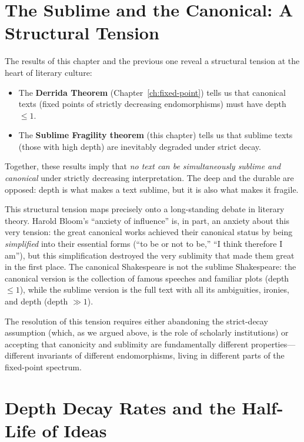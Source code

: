 \documentclass[11pt,openany]{book}
\theoremstyle{definition}
\theoremstyle{plain}
\theoremstyle{remark}
\begin{document}
\section{The Sublime and the Canonical: A Structural Tension}

The results of this chapter and the previous one reveal a structural tension at the heart of literary culture:

\begin{itemize}
\item The \textbf{Derrida Theorem} (Chapter~\ref{ch:fixed-point}) tells us that canonical texts (fixed points of strictly decreasing endomorphisms) must have depth $\leq 1$.
\item The \textbf{Sublime Fragility theorem} (this chapter) tells us that sublime texts (those with high depth) are inevitably degraded under strict decay.
\end{itemize}

Together, these results imply that \emph{no text can be simultaneously sublime and canonical} under strictly decreasing interpretation. The deep and the durable are opposed: depth is what makes a text sublime, but it is also what makes it fragile.

This structural tension maps precisely onto a long-standing debate in literary theory. Harold Bloom's ``anxiety of influence'' is, in part, an anxiety about this very tension: the great canonical works achieved their canonical status by being \emph{simplified} into their essential forms (``to be or not to be,'' ``I think therefore I am''), but this simplification destroyed the very sublimity that made them great in the first place. The canonical Shakespeare is not the sublime Shakespeare: the canonical version is the collection of famous speeches and familiar plots (depth $\leq 1$), while the sublime version is the full text with all its ambiguities, ironies, and depth (depth $\gg 1$).

The resolution of this tension requires either abandoning the strict-decay assumption (which, as we argued above, is the role of scholarly institutions) or accepting that canonicity and sublimity are fundamentally different properties---different invariants of different endomorphisms, living in different parts of the fixed-point spectrum.

\section{Depth Decay Rates and the Half-Life of Ideas}
\end{document}
